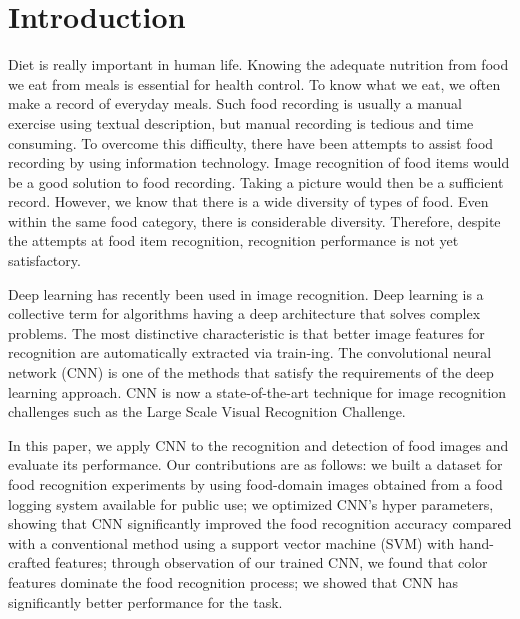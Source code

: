 \section{Introduction}
Diet is really important in human life. Knowing the adequate nutrition from food we eat from meals is essential for health control. To know what we eat, we often make a record of everyday meals. Such food recording is usually a manual exercise using textual description, but manual recording is tedious and time consuming. To overcome this difficulty, there have been attempts to assist food recording by using information technology. Image recognition of food items would be a good solution to food recording. Taking a picture would then be a sufficient record. However, we know that there is a wide diversity of types of food. Even within the same food category, there is considerable diversity. Therefore, despite the attempts at food item recognition, recognition performance is not yet satisfactory.


Deep learning has recently been used in image recognition. Deep learning is a collective term for algorithms having a deep architecture that solves complex problems. The most distinctive characteristic is that better image features for recognition are automatically extracted via train-ing. The convolutional neural network (CNN) is one of the methods that satisfy the requirements of the deep learning approach. CNN is now a state-of-the-art technique for image recognition challenges such as the Large Scale Visual Recognition Challenge.


In this paper, we apply CNN to the recognition and detection of food images and evaluate its performance. Our contributions are as follows: we built a dataset for food recognition experiments by using food-domain images obtained from a food logging system available for public use; we optimized CNN’s hyper parameters, showing that CNN signiﬁcantly improved the food recognition accuracy compared with a conventional method using a support vector machine (SVM) with hand-crafted features; through observation of our trained CNN, we found that color features dominate the food recognition process; we showed that CNN has signiﬁcantly better performance for the task.



